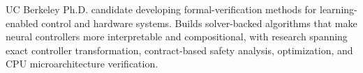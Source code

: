 
\begin{cvparagraph}
UC Berkeley Ph.D. candidate developing formal-verification methods for learning-enabled control and hardware systems. Builds solver-backed algorithms that make neural controllers more interpretable and compositional, with research spanning exact controller transformation, contract-based safety analysis, optimization, and CPU microarchitecture verification.
\end{cvparagraph}
\vspace{-4.0mm}
